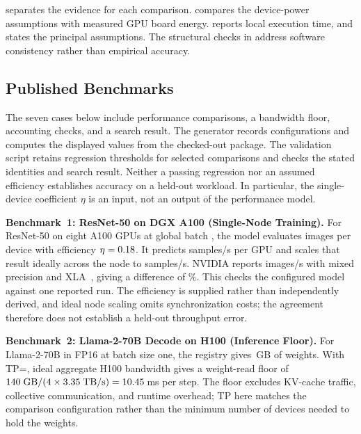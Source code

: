 \documentclass[10pt,twocolumn]{article}
\begin{document}
 separates the evidence for each comparison.  compares the device-power assumptions with measured GPU board energy.  reports local execution time, and  states the principal assumptions. The structural checks in  address software consistency rather than empirical accuracy.

\subsection{Published Benchmarks}
\label{sec:validation-benchmarks}

The seven cases below include performance comparisons, a bandwidth floor, accounting checks, and a search result. The generator records configurations and computes the displayed values from the checked-out package. The validation script retains regression thresholds for selected comparisons and checks the stated identities and search result. Neither a passing regression nor an assumed efficiency establishes accuracy on a held-out workload. In particular, the single-device coefficient $\eta$ is an input, not an output of the performance model.

\textbf{Benchmark~1: ResNet-50 on DGX A100 (Single-Node Training).}
For ResNet-50 on eight A100 GPUs at global batch \AnchorOneGlobalBatch{}, the model evaluates \AnchorOnePerGpuBatch{} images per device with efficiency $\eta=0.18$. It predicts \AnchorOneSimPerGpu{} samples/s per GPU and scales that result ideally across the node to \AnchorOneSimThroughput{} samples/s. NVIDIA reports \AnchorOneReported{} images/s with mixed precision and XLA~\citep{nvidia2020dleresnet}, giving a difference of \AnchorOneErrorPct\%. This checks the configured model against one reported run. The efficiency is supplied rather than independently derived, and ideal node scaling omits synchronization costs; the agreement therefore does not establish a held-out throughput error.

\textbf{Benchmark~2: Llama-2-70B Decode on H100 (Inference Floor).}
For Llama-2-70B in FP16 at batch size one, the registry gives \AnchorTwoWeightsGB\,GB of weights. With TP=\AnchorTwoTpDegree{}, ideal aggregate H100 bandwidth gives a weight-read floor of $140\;\text{GB}/(4\times3.35\;\text{TB/s})=10.45$\,ms per step. The floor excludes KV-cache traffic, collective communication, and runtime overhead; TP here matches the comparison configuration rather than the minimum number of devices needed to hold the weights.
\end{document}
